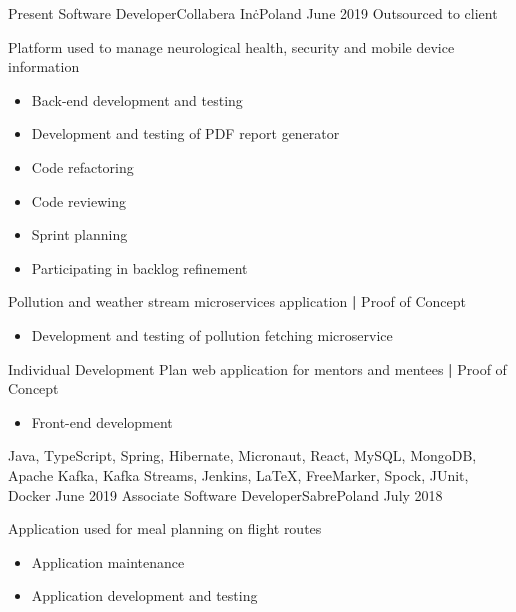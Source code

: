 
\begin{experiences}
  \contractorexperience
    {Present}   {Software Developer}{Collabera Inc\.}{Poland}
    {June 2019} {Outsourced to client}
                {
                        Platform used to manage neurological health, security and mobile device information
                        \begin{itemize}
                            \item Back-end development and testing      \item Development and testing of PDF report generator
                            \item Code refactoring
                            \item Code reviewing
                            \item Sprint planning
                            \item Participating in backlog refinement
                        \end{itemize}
                        Pollution and weather stream microservices application \textbf{|} \small{Proof of Concept}\normalsize
                        \begin{itemize}
                            \item Development and testing of pollution fetching microservice
                        \end{itemize}
                        Individual Development Plan web application for mentors and mentees \textbf{|} \small{Proof of Concept}\normalsize
                        \begin{itemize}
                            \item Front-end development
                        \end{itemize}
                    }
                    {Java, TypeScript, Spring, Hibernate, Micronaut, React, MySQL, MongoDB, Apache Kafka, Kafka Streams, Jenkins, LaTeX, FreeMarker, Spock, JUnit, Docker}
  \emptySeparator
  \experience
    {June 2019} {Associate Software Developer}{Sabre}{Poland}
    {July 2018}    {
                        Application used for meal planning on flight routes
                        \begin{itemize}
                            \item Application maintenance
                            \item Application development and testing

\end{itemize}}
\end{experiences}

